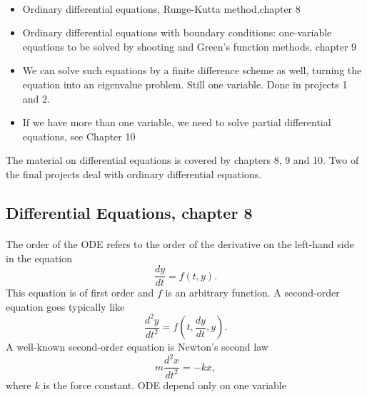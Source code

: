 \documentclass[%
oneside,                 %
final,                   %
10pt]{article}
\begin{document}
\paragraph{}
\begin{itemize}
 \item Ordinary differential equations, Runge-Kutta method,chapter 8

 \item Ordinary differential equations with boundary conditions: one-variable equations to be solved by shooting and Green's function methods, chapter 9

 \item We can solve such equations by a finite difference scheme as well, turning the equation into an eigenvalue problem. Still one variable. Done in projects 1 and 2.

 \item If we have more than one variable, we need to solve  partial differential equations, see Chapter 10
\end{itemize}

\noindent
The material on differential equations is covered by chapters 8, 9 and 10.
Two of  the final projects deal with ordinary differential equations.





\subsection*{Differential Equations, chapter 8}

\paragraph{}
The order of the ODE refers to the order of the derivative 
on the left-hand side in the equation
\begin{equation} 
   \frac{dy}{dt}=f(t,y).
\end{equation}
This equation is of first order and $f$ is an arbitrary function.
A second-order equation goes typically like
\begin{equation} 
   \frac{d^2y}{dt^2}=f(t,\frac{dy}{dt},y).
\end{equation}
A well-known second-order equation is Newton's second law
\begin{equation} 
   m\frac{d^2x}{dt^2}=-kx,
   \label{eq:newton}
\end{equation}
where $k$ is the force constant. ODE depend only on one
variable
\end{document}
